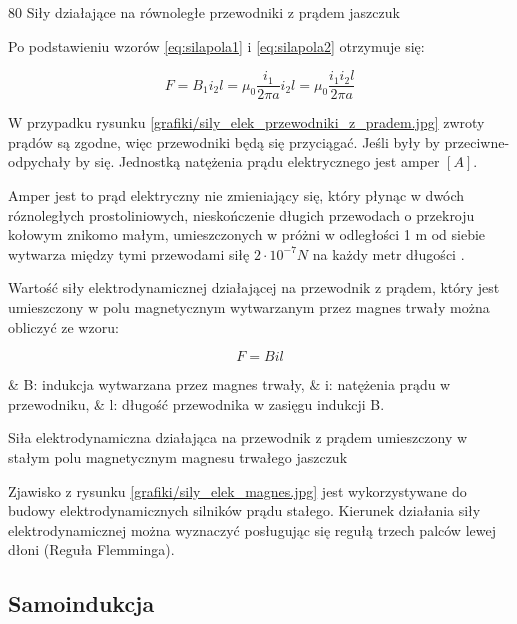 		{80}
	   	{Siły działające na równoległe przewodniki z prądem}
	   	{jaszczuk}
	   	
Po podstawieniu wzorów \ref{eq:silapola1} i \ref{eq:silapola2} otrzymuje się:

\begin{equation} \label{eq:silapola3}
	F = B_1 i_2 l = \mu_0 \frac{i_1}{2 \pi a} i_2 l = \mu_0 \frac{i_1 i_2 l}{2 \pi a}	
\end{equation}
	
W przypadku rysunku \ref{grafiki/sily_elek_przewodniki_z_pradem.jpg} zwroty prądów są zgodne, więc przewodniki będą się przyciągać. Jeśli były by przeciwne- odpychały by się. 
Jednostką natężenia prądu elektrycznego jest amper $ [A] $.

\begin{defn}
	Amper jest to prąd elektryczny nie zmieniający się, który płynąc w dwóch róznoległych prostoliniowych, nieskończenie długich przewodach o przekroju kołowym znikomo małym, umieszczonych w próżni w odległości 1 m od siebie wytwarza między tymi przewodami siłę $ 2 \cdot 10^{-7} N $ na każdy metr długości \cite{kaluszko}.
\end{defn}  
	
Wartość siły elektrodynamicznej działającej na przewodnik z prądem, który jest umieszczony w polu magnetycznym wytwarzanym przez magnes trwały można obliczyć ze wzoru:

\begin{equation} \label{eq:silapola4}
	F = B i l
\end{equation}

\begin{easylist}
	& B: indukcja wytwarzana przez magnes trwały,
	& i: natężenia prądu w przewodniku,
	& l: długość przewodnika w zasięgu indukcji B.
	\\
\end{easylist} 

	   {Siła elektrodynamiczna działająca na przewodnik z prądem umieszczony w stałym polu magnetycznym magnesu trwałego}
	   {jaszczuk}
	   
Zjawisko z rysunku \ref{grafiki/sily_elek_magnes.jpg} jest wykorzystywane do budowy elektrodynamicznych silników prądu stałego.
Kierunek działania siły elektrodynamicznej można wyznaczyć posługując się regułą trzech palców lewej dłoni (Reguła Flemminga).
	   
\subsection{Samoindukcja} 
	

